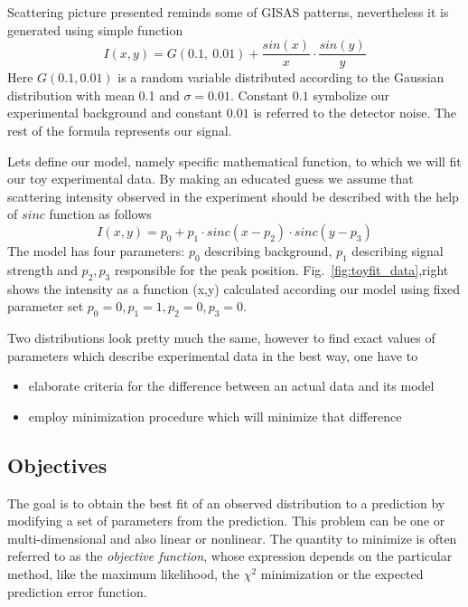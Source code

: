 Scattering picture presented reminds some of GISAS patterns, nevertheless it is
generated using simple function
$$I(x,y) = G(0.1,~0.01) + \frac{sin(x)}{x} \cdot \frac{sin(y)}{y}$$
Here $G(0.1, 0.01)$ is a random variable distributed according to the Gaussian distribution
with mean 0.1 and $\sigma=0.01$.
Constant $0.1$ symbolize our experimental background and constant $0.01$ is referred
to the detector noise. The rest of the formula represents our signal.

Lets define our model, namely specific mathematical function, to which we will fit our toy experimental data. By making an educated guess we assume that scattering intensity observed
in the experiment should be described with the help of $sinc$ function as follows
$$ I(x,y) = p_0 + p_1 \cdot  sinc(x - p_2) \cdot sinc(y - p_3) $$
The model has four parameters: $p_0$ describing background, $p_{1}$ describing signal strength
and $p_2,p_3$ responsible for the peak position.
Fig.~\ref{fig:toyfit_data},right shows the intensity as a function (x,y) calculated according
our model using fixed parameter set $p_0=0,p_1=1,p_2=0,p_3=0$. 

Two distributions look pretty much the same, however to find exact values of parameters which describe experimental data in the best way, one have to
\begin{itemize}
\item elaborate criteria for the difference between an actual data and its model
\item employ minimization procedure which will minimize that difference
\end{itemize}


\subsection{Objectives}

The goal is to obtain the best fit of an observed distribution
to a prediction by modifying a set of parameters from the
prediction. This problem can be one or multi-dimensional and also linear or
nonlinear. The quantity to minimize is often referred to as the
\textit{objective function}, whose expression depends on the
particular method, like the maximum likelihood, the $\chi^2$
minimization or the expected prediction error function. 

